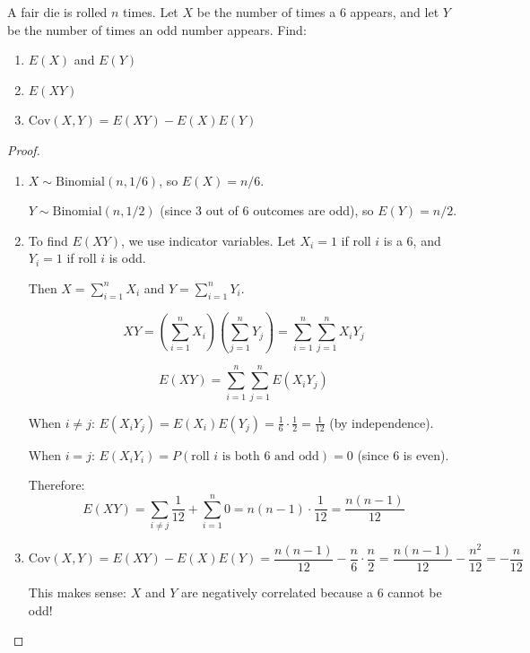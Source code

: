 \begin{exercise}
A fair die is rolled \(n\) times. Let \(X\) be the number of times a 6 appears, and let \(Y\) be the number of times an odd number appears. Find:
\begin{enumerate}[label=(\alph*)]
    \item \(E(X)\) and \(E(Y)\)
    \item \(E(XY)\)
    \item \(\text{Cov}(X, Y) = E(XY) - E(X)E(Y)\)
\end{enumerate}
\end{exercise}

\begin{proof}
\begin{enumerate}[label=(\alph*)]
    \item \(X \sim \text{Binomial}(n, 1/6)\), so \(E(X) = n/6\).
    
    \(Y \sim \text{Binomial}(n, 1/2)\) (since 3 out of 6 outcomes are odd), so \(E(Y) = n/2\).
    
    \item To find \(E(XY)\), we use indicator variables. Let \(X_i = 1\) if roll \(i\) is a 6, and \(Y_i = 1\) if roll \(i\) is odd.
    
    Then \(X = \sum_{i=1}^{n} X_i\) and \(Y = \sum_{i=1}^{n} Y_i\).
    
    \[
    XY = \left(\sum_{i=1}^{n} X_i\right)\left(\sum_{j=1}^{n} Y_j\right) = \sum_{i=1}^{n} \sum_{j=1}^{n} X_i Y_j
    \]
    
    \[
    E(XY) = \sum_{i=1}^{n} \sum_{j=1}^{n} E(X_i Y_j)
    \]
    
    When \(i \neq j\): \(E(X_i Y_j) = E(X_i)E(Y_j) = \frac{1}{6} \cdot \frac{1}{2} = \frac{1}{12}\) (by independence).
    
    When \(i = j\): \(E(X_i Y_i) = P(\text{roll } i \text{ is both 6 and odd}) = 0\) (since 6 is even).
    
    Therefore:
    \[
    E(XY) = \sum_{i \neq j} \frac{1}{12} + \sum_{i=1}^{n} 0 = n(n-1) \cdot \frac{1}{12} = \frac{n(n-1)}{12}
    \]
    
    \item 
    \[
    \text{Cov}(X, Y) = E(XY) - E(X)E(Y) = \frac{n(n-1)}{12} - \frac{n}{6} \cdot \frac{n}{2} = \frac{n(n-1)}{12} - \frac{n^2}{12} = -\frac{n}{12}
    \]
    
    This makes sense: \(X\) and \(Y\) are negatively correlated because a 6 cannot be odd!
\end{enumerate}
\end{proof}

